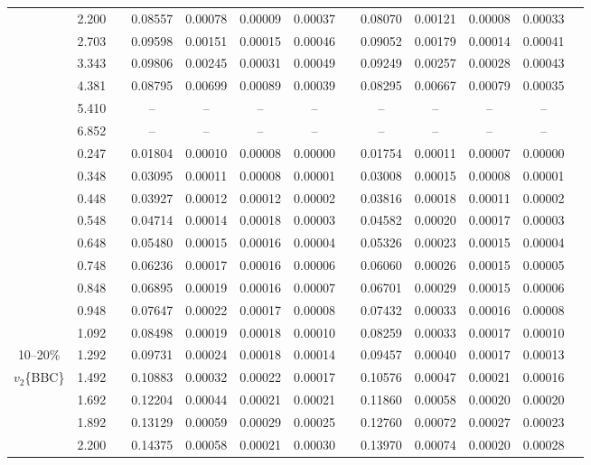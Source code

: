 \documentclass[aps,prc,superscriptaddress,showpacs,floatfix,twocolumn]{revtex4}
\begin{document}
\begin{table}[htbp]
\begin{ruledtabular}
\begin{tabular}{c|cccccccccccc}
 & 2.200 && 0.08557 & 0.00078 & 0.00009 & 0.00037 & & 0.08070 & 0.00121 & 0.00008 & 0.00033 \\ 
 & 2.703 && 0.09598 & 0.00151 & 0.00015 & 0.00046 & & 0.09052 & 0.00179 & 0.00014 & 0.00041 \\ 
 & 3.343 && 0.09806 & 0.00245 & 0.00031 & 0.00049 & & 0.09249 & 0.00257 & 0.00028 & 0.00043 \\ 
 & 4.381 && 0.08795 & 0.00699 & 0.00089 & 0.00039 & & 0.08295 & 0.00667 & 0.00079 & 0.00035 \\ 
 & 5.410 && -- & -- & -- & -- & & -- & -- & -- & -- \\ 
 & 6.852 && -- & -- & -- & -- & & -- & -- & -- & -- \\ 
\hline 
 & 0.247 && 0.01804 & 0.00010 & 0.00008 & 0.00000 & & 0.01754 & 0.00011 & 0.00007 & 0.00000 \\ 
 & 0.348 && 0.03095 & 0.00011 & 0.00008 & 0.00001 & & 0.03008 & 0.00015 & 0.00008 & 0.00001 \\ 
 & 0.448 && 0.03927 & 0.00012 & 0.00012 & 0.00002 & & 0.03816 & 0.00018 & 0.00011 & 0.00002 \\ 
 & 0.548 && 0.04714 & 0.00014 & 0.00018 & 0.00003 & & 0.04582 & 0.00020 & 0.00017 & 0.00003 \\ 
 & 0.648 && 0.05480 & 0.00015 & 0.00016 & 0.00004 & & 0.05326 & 0.00023 & 0.00015 & 0.00004 \\ 
 & 0.748 && 0.06236 & 0.00017 & 0.00016 & 0.00006 & & 0.06060 & 0.00026 & 0.00015 & 0.00005 \\ 
 & 0.848 && 0.06895 & 0.00019 & 0.00016 & 0.00007 & & 0.06701 & 0.00029 & 0.00015 & 0.00006 \\ 
 & 0.948 && 0.07647 & 0.00022 & 0.00017 & 0.00008 & & 0.07432 & 0.00033 & 0.00016 & 0.00008 \\ 
 & 1.092 && 0.08498 & 0.00019 & 0.00018 & 0.00010 & & 0.08259 & 0.00033 & 0.00017 & 0.00010 \\ 
10--20\%
 & 1.292 && 0.09731 & 0.00024 & 0.00018 & 0.00014 & & 0.09457 & 0.00040 & 0.00017 & 0.00013 \\ 
$v_2$\{BBC\}
 & 1.492 && 0.10883 & 0.00032 & 0.00022 & 0.00017 & & 0.10576 & 0.00047 & 0.00021 & 0.00016 \\ 
 & 1.692 && 0.12204 & 0.00044 & 0.00021 & 0.00021 & & 0.11860 & 0.00058 & 0.00020 & 0.00020 \\ 
 & 1.892 && 0.13129 & 0.00059 & 0.00029 & 0.00025 & & 0.12760 & 0.00072 & 0.00027 & 0.00023 \\ 
 & 2.200 && 0.14375 & 0.00058 & 0.00021 & 0.00030 & & 0.13970 & 0.00074 & 0.00020 & 0.00028 \\ 

\end{tabular}
\end{ruledtabular}
\end{table}
\end{document}
